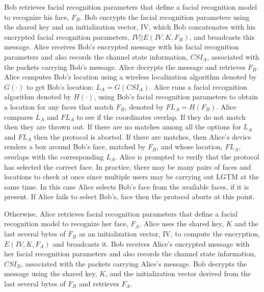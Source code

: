 \documentclass[12pt]{report}
\begin{document}
Bob retrieves facial recognition parameters that define a facial recognition model to recognize his face, $F_{B}$. Bob encrypts the facial recognition parameters using the shared key and an initialization vector, IV, which Bob concatenates with his encrypted facial recognition parameters, $IV || E(IV, K, F_{B})$, and broadcasts this message. Alice receives Bob's encrypted message with his facial recognition parameters and also records the channel state information, $CSI_{A}$, associated with the packets carrying Bob's message. Alice decrypts the message and retrieves $F_{B}$. Alice computes Bob's location using a wireless localization algorithm denoted by $G(\cdot)$ to get Bob's location: $L_{A} = G(CSI_{A})$. Alice runs a facial recognition algorithm denoted by $H(\cdot)$, using Bob's facial recognition parameters to obtain a location for any faces that match $F_{B}$, denoted by $FL_{A} = H(F_{B})$. Alice compares $L_{A}$ and $FL_{A}$ to see if the coordinates overlap. If they do not match then they are thrown out. If there are no matches among all the options for $L_{A}$ and $FL_{A}$ then the protocol is aborted. If there are matches, then Alice's device renders a box around Bob's face, matched by $F_{B}$, and whose location, $FL_{A}$, overlaps with the corresponding $L_{A}$. Alice is prompted to verify that the protocol has selected the correct face. In practice, there may be many pairs of faces and locations to check at once since multiple users may be carrying out LGTM at the same time. In this case Alice selects Bob's face from the available faces, if it is present. If Alice fails to select Bob's, face then the protocol aborts at this point. \par

Otherwise, Alice retrieves facial recognition parameters that define a facial recognition model to recognize her face, $F_{A}$. Alice uses the shared key, $K$ and the last several bytes of $F_{B}$ as an initialization vector, IV, to compute the encryption, $E(IV, K, F_{A})$ and broadcasts it. Bob receives Alice's encrypted message with her facial recognition parameters and also records the channel state information, $CSI_{B}$, associated with the packets carrying Alice's message. Bob decrypts the message using the shared key, $K$, and the initialization vector derived from the last several bytes of $F_{B}$ and retrieves $F_{A}$. \par
\end{document}
